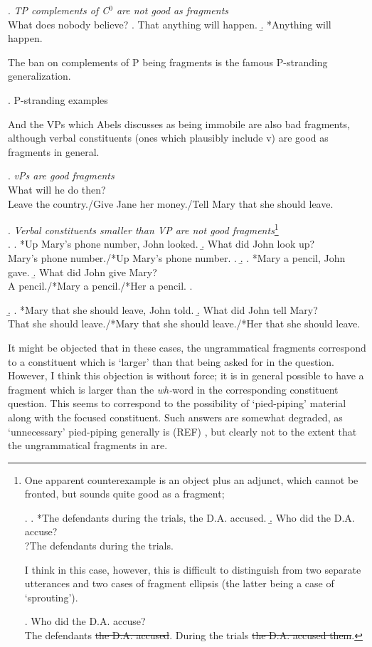 \documentclass[11pt,letterpaper]{article}
\begin{document}
 \ex. 	{\it TP complements of C$^0$ are not good as fragments}\\
 	What does nobody believe?
 	\a. That anything will happen.
 	\b. *Anything will happen.
 	
 The ban on complements of P being fragments is the famous P-stranding generalization.
 
 \ex. 	P-stranding examples %
 
 And the VPs which Abels discusses as being immobile are also bad fragments, although verbal constituents (ones which plausibly include v) are good as fragments in general.
 
 \ex. 	{\it vPs are good fragments}\\
 	What will he do then?\\
 	Leave the country./Give Jane her money./Tell Mary that she should leave.
 	
 \ex. 	{\it Verbal constituents smaller than VP are not good fragments}\footnote{One apparent counterexample is an object plus an adjunct, which cannot be fronted, but sounds quite good as a fragment;
 
 \ex.	\a. *The defendants during the trials, the D.A. accused.
 	\b. Who did the D.A. accuse?\\
 		?The defendants during the trials.
 
 I think in this case, however, this is difficult to distinguish from two separate utterances and two cases of fragment ellipsis (the latter being a case of `sprouting').
 
 \ex.	Who did the D.A. accuse?\\
 	The defendants \sout{the D.A. accused}. During the trials \sout{the D.A. accused them}.
 	
 {}
 
 }\\
 	\a. 	\a. *Up Mary's phone number, John looked.
 		\b. What did John look up?\\
 			Mary's phone number./*Up Mary's phone number.
 		\z.
 	\b.	\a. *Mary a pencil, John gave.
 		\b. What did John give Mary?\\
 			A pencil./*Mary a pencil./*Her a pencil.
 		\z.

 	\b. 	\a. *Mary that she should leave, John told.
 		\b. What did John tell Mary?\\
 			That she should leave./*Mary that she should leave./*Her that she should leave.
 
 It might be objected that in these cases, the ungrammatical fragments correspond to a constituent which is `larger' than that being asked for in the question.
 However, I think this objection is without force; it is in general possible to have a fragment which is larger than the {\it wh-}word in the corresponding constituent question.
 This seems to correspond to the possibility of `pied-piping' material along with the focused constituent.
 Such answers are somewhat degraded, as `unnecessary' pied-piping generally is (REF) %
 , but clearly not to the extent that the ungrammatical fragments in \Last are.
 
\end{document}
